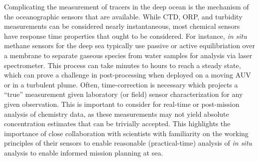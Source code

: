 Complicating the measurement of tracers in the deep ocean is the mechanism of the oceanographic sensors that are available. While CTD, ORP, and turbidity measurements can be considered nearly instantaneous, most chemical sensors have response time properties that ought to be considered. For instance, \emph{in situ} methane sensors for the deep sea typically use passive or active equilibriation over a membrane to separate gaseous species from water samples for analysis via laser spectrometer. This process can take minutes to hours to reach a steady state, which can prove a challenge in post-processing when deployed on a moving AUV or in a turbulent plume. Often, time-correction is necessary \autocite{bittig2018oxygen} which projects a ``true'' measurement given laboratory (or field) sensor characterization for any given observation. This is important to consider for real-time or post-mission analysis of chemistry data, as these measurements may not yield absolute concentration estimates that can be trivially accepted. This highlights the importance of close collaboration with scientists with familiarity on the working principles of their sensors to enable reasonable (practical-time) analysis of \emph{in situ} analysis to enable informed mission planning at sea. 



